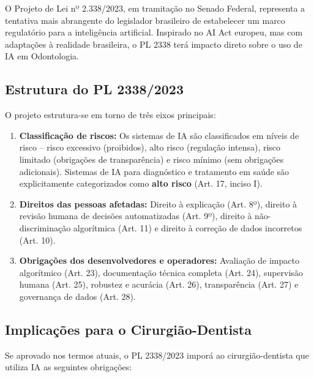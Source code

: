 O Projeto de Lei nº 2.338/2023, em tramitação no Senado Federal, representa a
tentativa mais abrangente do legislador brasileiro de estabelecer um marco
regulatório para a inteligência artificial. Inspirado no AI Act europeu, mas
com adaptações à realidade brasileira, o PL 2338 terá impacto direto sobre o
uso de IA em Odontologia.


\subsection{Estrutura do PL 2338/2023}

O projeto estrutura-se em torno de três eixos principais:

\begin{enumerate}
  \item \textbf{Classificação de riscos:} Os sistemas de IA são classificados
    em níveis de risco -- risco excessivo (proibidos), alto risco (regulação
    intensa), risco limitado (obrigações de transparência) e risco mínimo (sem
    obrigações adicionais). Sistemas de IA para diagnóstico e tratamento em
    saúde são explicitamente categorizados como \textbf{alto risco} (Art. 17,
    inciso I).

  \item \textbf{Direitos das pessoas afetadas:} Direito à explicação (Art. 8º),
    direito à revisão humana de decisões automatizadas (Art. 9º), direito à
    não-discriminação algorítmica (Art. 11) e direito à correção de dados
    incorretos (Art. 10).

  \item \textbf{Obrigações dos desenvolvedores e operadores:} Avaliação de
    impacto algorítmico (Art. 23), documentação técnica completa (Art. 24),
    supervisão humana (Art. 25), robustez e acurácia (Art. 26), transparência
    (Art. 27) e governança de dados (Art. 28).
\end{enumerate}

\subsection{Implicações para o Cirurgião-Dentista}

Se aprovado nos termos atuais, o PL 2338/2023 imporá ao cirurgião-dentista que
utiliza IA as seguintes obrigações:

